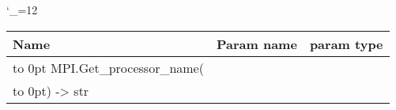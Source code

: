 \begingroup \catcode`\_=12 \tt
\begin{tabular}{lll}
\toprule
\textrm{Name}&\textrm{Param name}&\textrm{param type}\\
\midrule
\hbox to 0pt {MPI.Get_processor_name(\hss}\\
\hbox to 0pt{) -> str\hss}\\
\bottomrule
\end{tabular}
\endgroup
